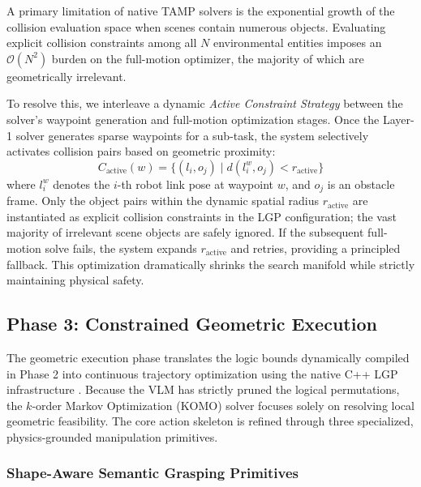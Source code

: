 \documentclass[journal]{IEEEtran}
\begin{document}
  A primary limitation of native TAMP solvers is the exponential growth of the collision evaluation space when scenes contain numerous objects. Evaluating
  explicit collision constraints among all $N$ environmental entities imposes an
  $\mathcal{O}(N^2)$ burden on the full-motion optimizer, the majority of which are
  geometrically irrelevant.

  To resolve this, we interleave a dynamic \textit{Active Constraint Strategy}
  between the solver's waypoint generation and full-motion optimization stages.
  Once the Layer-1 solver generates sparse waypoints for a sub-task, the system
  selectively activates collision pairs based on geometric proximity:
  \begin{equation}
    C_{\text{active}}(w) = \{(l_i, o_j) \mid d(l_i^w, o_j) < r_{\text{active}}\}
    \label{eq:active_constraints}
  \end{equation}
  where $l_i^w$ denotes the $i$-th robot link pose at waypoint $w$, and $o_j$ is an
  obstacle frame. Only the object pairs within the dynamic spatial radius
  $r_{\text{active}}$ are instantiated as explicit collision constraints in the LGP
  configuration; the vast majority of irrelevant scene objects are safely ignored.
  If the subsequent full-motion solve fails, the system expands $r_{\text{active}}$
  and retries, providing a principled fallback. This optimization dramatically
  shrinks the search manifold while strictly maintaining physical safety.

  \subsection{Phase 3: Constrained Geometric Execution}
  \label{subsec:phase3}

  The geometric execution phase translates the logic bounds dynamically compiled
  in Phase 2 into continuous trajectory optimization using the native C++ LGP infrastructure
  \cite{cite_lgp_2015}. Because the VLM has strictly pruned the logical
  permutations, the $k$-order Markov Optimization (KOMO) solver focuses solely on
  resolving local geometric feasibility. The core action skeleton is refined
  through three specialized, physics-grounded manipulation primitives.

  \subsubsection{Shape-Aware Semantic Grasping Primitives}
  \label{subsubsec:shape_pick}
\end{document}
